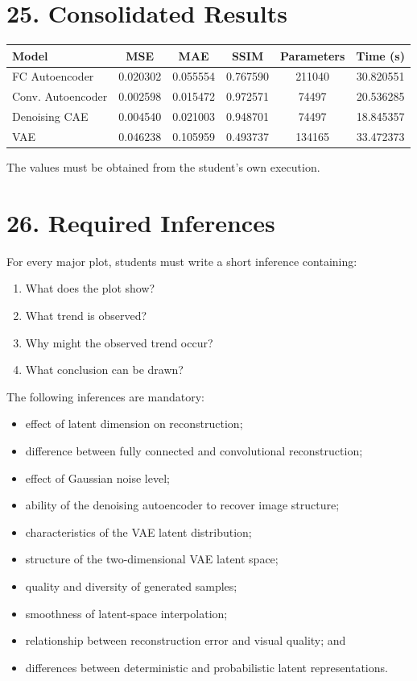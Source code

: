 \documentclass[10pt]{article}
\begin{document}
\section*{25. Consolidated Results}



\begin{center}
\begin{tabular}{|l|c|c|c|c|c|}
\hline
Model & MSE & MAE & SSIM & Parameters & Time (s)\\
\hline
FC Autoencoder & 0.020302 & 0.055554 & 0.767590 & 211040 & 30.820551\\
Conv. Autoencoder & 0.002598 & 0.015472 & 0.972571 & 74497 & 20.536285\\
Denoising CAE & 0.004540 & 0.021003 & 0.948701 & 74497 & 18.845357\\
VAE & 0.046238 & 0.105959 & 0.493737 & 134165 & 33.472373\\
\hline
\end{tabular}
\end{center}


The values must be obtained from the student's own execution.

\section*{26. Required Inferences}

For every major plot, students must write a short inference containing:

\begin{enumerate}
\item What does the plot show?
\item What trend is observed?
\item Why might the observed trend occur?
\item What conclusion can be drawn?
\end{enumerate}

The following inferences are mandatory:

\begin{itemize}
\item effect of latent dimension on reconstruction;
\item difference between fully connected and convolutional reconstruction;
\item effect of Gaussian noise level;
\item ability of the denoising autoencoder to recover image structure;
\item characteristics of the VAE latent distribution;
\item structure of the two-dimensional VAE latent space;
\item quality and diversity of generated samples;
\item smoothness of latent-space interpolation;
\item relationship between reconstruction error and visual quality; and
\item differences between deterministic and probabilistic latent representations.
\end{itemize}
\end{document}

